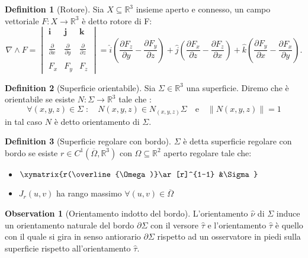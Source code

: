 \documentclass[leqno]{article}
\theoremstyle{definition}
\newtheorem{definition}{Definition}[section]
\numberwithin{equation}{section}
\newtheorem{observation}[theorem]{Observation}
\theoremstyle{remark}
\begin{document}
		\begin{definition}[Rotore]
			Sia $X \subseteq \mathbb{R}^3$ insieme aperto e connesso, un campo vettoriale $F:X \to \mathbb{R}^3$ è detto rotore di F:
			\begin{equation}
				\nabla \wedge F= \begin{vmatrix}\mathbf {i} &\mathbf {j} &\mathbf {k} \\\\{\frac {\partial }{\partial x}}&{\frac {\partial }{\partial y}}&{\frac {\partial }{\partial z}}\\\\F_{x}&F_{y}&F_{z}\end{vmatrix}=\hat{i} \left({\frac {\partial F_{z}}{\partial y}}-{\frac {\partial F_{y}}{\partial z}}\right)+\hat{j} \left({\frac {\partial F_{x}}{\partial z}}-{\frac {\partial F_{z}}{\partial x}}\right)+\hat{k} \left({\frac {\partial F_{y}}{\partial x}}-{\frac {\partial F_{x}}{\partial y}}\right).
			\end{equation}
		\end{definition}
		
		\begin{definition}[Superficie orientabile]
			Sia $\Sigma \in \mathbb{R}^3 $ una superficie. Diremo che è   orientabile se esiste $N:\Sigma \to \mathbb{R}^3$ tale che :
			\begin{equation}
				\forall(x,y,z)\in \Sigma \; : \quad N(x,y,z)\in N_{(x,y,z)}\Sigma \quad \text{e} \quad \lVert N(x,y,z) \rVert = 1
			\end{equation}
			in tal caso $N$ è detto orientamento di $\Sigma$.
		\end{definition}
		
		\begin{definition}[Superficie regolare con bordo]
			$\Sigma$ è detta superficie regolare con bordo se esiste $r\in C^1(\overline{\Omega}, \mathbb{R}^3)$ con $\Omega \subseteq \mathbb{R}^2$ aperto regolare tale che:
			\begin{itemize}
				\item $\xymatrix{r(\overline{\Omega)}\ar[r]^{1-1} &\Sigma}$
				\item $J_r(u,v)$ ha rango massimo $\forall (u,v)\in \overline{\Omega}$
			\end{itemize}
		\end{definition}
		
		\begin{observation}[Orientamento indotto del bordo]
			L'orientamento $\hat{\nu}$ di $\Sigma$ induce un orientamento naturale del bordo $\partial \Sigma$ con il versore $\hat{\tau}$ e l'orientamento $\hat{\tau}$ è quello con il quale si gira in senso antiorario $\partial\Sigma$ rispetto ad un osservatore in piedi sulla superficie rispetto all'orientamento $\hat{\tau}$.
		\end{observation}
		
\end{document}
